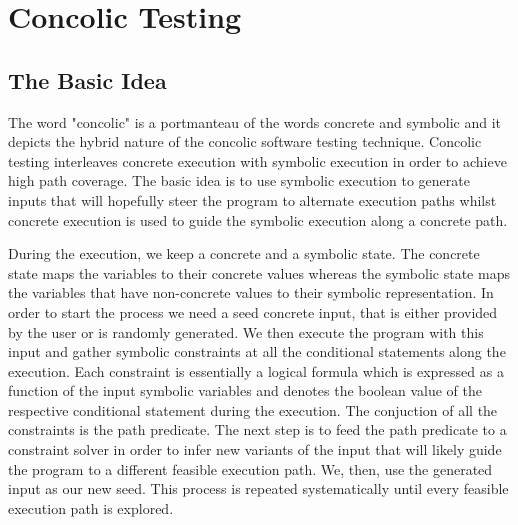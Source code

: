 \chapter{Concolic Testing}\label{ch:concolic_testing}

\section{The Basic Idea}\label{sec:conc_basic_idea}

The word "concolic" is a portmanteau of the words concrete and symbolic and it
depicts the hybrid nature of the concolic software testing technique. Concolic testing
interleaves concrete execution with symbolic execution in order to achieve high
path coverage. The basic idea is to use symbolic execution to generate inputs
that will hopefully steer the program to alternate execution paths whilst
concrete execution is used to guide the symbolic execution along a concrete
path.

During the execution, we keep a concrete and a symbolic state. The concrete
state maps the variables to their concrete values whereas the symbolic state
maps the variables that have non-concrete values to their symbolic
representation. In order to start the process we need a seed concrete input,
that is either provided by the user or is randomly generated. We then execute
the program with this input and gather symbolic constraints at all the
conditional statements along the execution. Each constraint is essentially a
logical formula which is expressed as a function of the input symbolic
variables and denotes the boolean value of the respective conditional statement
during the execution. The conjuction of all the constraints is the path
predicate. The next step is to feed the path predicate to a constraint solver
in order to infer new variants of the input that will likely guide the program
to a different feasible execution path. We, then, use the generated input as
our new seed. This process is repeated systematically until every feasible
execution path is explored.


